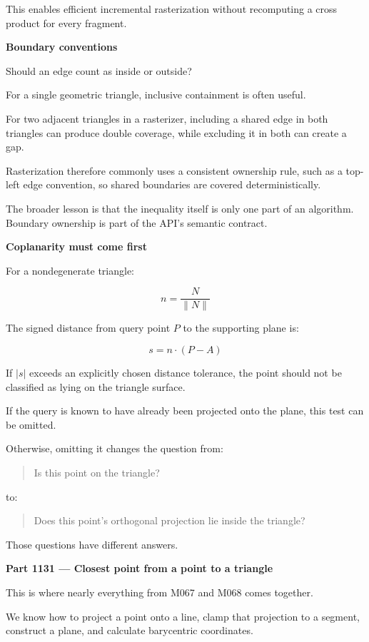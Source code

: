 This enables efficient incremental rasterization without recomputing a cross product for every fragment.

\textbf{Boundary conventions}

Should an edge count as inside or outside?

For a single geometric triangle, inclusive containment is often useful.

For two adjacent triangles in a rasterizer, including a shared edge in both triangles can produce double coverage, while excluding it in both can create a gap.

Rasterization therefore commonly uses a consistent ownership rule, such as a top-left edge convention, so shared boundaries are covered deterministically.

The broader lesson is that the inequality itself is only one part of an algorithm. Boundary ownership is part of the API's semantic contract.

\textbf{Coplanarity must come first}

For a nondegenerate triangle:

\[
n=\frac{N}{\|N\|}
\]

The signed distance from query point \(P\) to the supporting plane is:

\[
s=n\cdot(P-A)
\]

If \(|s|\) exceeds an explicitly chosen distance tolerance, the point should not be classified as lying on the triangle surface.

If the query is known to have already been projected onto the plane, this test can be omitted.

Otherwise, omitting it changes the question from:

\begin{quote}
Is this point on the triangle?
\end{quote}

to:

\begin{quote}
Does this point's orthogonal projection lie inside the triangle?
\end{quote}

Those questions have different answers.

\textbf{Part 1131 --- Closest point from a point to a triangle}

This is where nearly everything from M067 and M068 comes together.

We know how to project a point onto a line, clamp that projection to a segment, construct a plane, and calculate barycentric coordinates.

